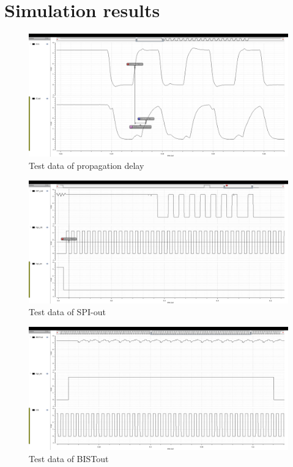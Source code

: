 \section{Simulation results}
\label{app:simulations}

\begin{figure}[H]
	\centering
	\captionsetup{justification=centering}
	\includegraphics[angle=90, scale=0.35]{../figures/cm_200_cin_cout.png}
	\caption{Test data of propagation delay}
\end{figure}

\begin{figure}[H]
	\centering
	\captionsetup{justification=centering}
	\includegraphics[angle=90, scale=0.35]{../figures/cm_200_spi_out.png}
	\caption{Test data of SPI-out} 
\end{figure}

\begin{figure}[H]
  \centering
  \captionsetup{justification=centering}
  \includegraphics[angle=90, scale=0.35]{../figures/cm_200_bistout.png}
  \caption{Test data of BISTout} 
\end{figure}

